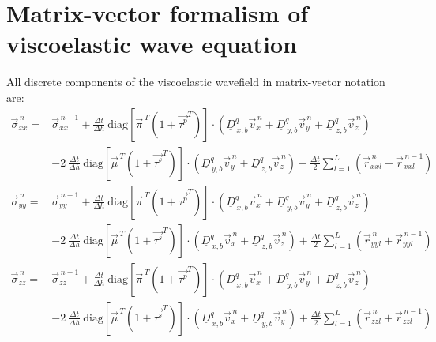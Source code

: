 \documentclass[pdftex,a4paper,parskip,listof=totoc,bibliography=totoc,onehalfspacing,12pt]{scrreprt}
\begin{document}
\section{Matrix-vector formalism of viscoelastic wave equation}
All discrete components of the viscoelastic wavefield in matrix-vector notation are: 
\begin{align*}
	\vec{\sigma}_{xx}^{\,n} =& \vec{\sigma}_{xx}^{\,n-1} + \frac{\Delta t}{\Delta h}~ \mathrm{diag} \left[ \vec{\pi}^{\,T} (1+\vec{\tau^p}^{T}) \right] \cdot \left( \underline{D}_{\,x,b}^q \vec{v}_x^{\,n} +\underline{D}_{\,y,b}^q \vec{v}_y^{\,n} + \underline{D}_{\,z,b}^q \vec{v}_z^{\,n} \right) \\
	&- 2~ \frac{\Delta t}{\Delta h} ~\mathrm{diag} \left[ \vec{\mu}^{\,T} (1+\vec{\tau^s}^{T}) \right] \cdot \left( \underline{D}_{\,y,b}^q \vec{v}_y^{\,n} + \underline{D}_{\,z,b}^q \vec{v}_z^{\,n} \right) + \frac{\Delta t}{2} \sum_{l=1}^L \left( \vec{r}_{xxl}^{\,n} + \vec{r}_{xxl}^{\,n-1} \right)\\
	\vec{\sigma}_{yy}^{\,n} =& \vec{\sigma}_{yy}^{\,n-1} + \frac{\Delta t}{\Delta h}~ \mathrm{diag} \left[ \vec{\pi}^{\,T} (1+\vec{\tau^p}^{T}) \right] \cdot \left( \underline{D}_{\,x,b}^q \vec{v}_x^{\,n} +\underline{D}_{\,y,b}^q \vec{v}_y^{\,n} + \underline{D}_{\,z,b}^q \vec{v}_z^{\,n} \right) \\
	&- 2~ \frac{\Delta t}{\Delta h} ~\mathrm{diag} \left[ \vec{\mu}^{\,T} (1+\vec{\tau^s}^{T}) \right] \cdot \left( \underline{D}_{\,x,b}^q \vec{v}_x^{\,n} + \underline{D}_{\,z,b}^q \vec{v}_z^{\,n} \right) + \frac{\Delta t}{2} \sum_{l=1}^L \left( \vec{r}_{yyl}^{\,n} + \vec{r}_{yyl}^{\,n-1} \right)\\
	\vec{\sigma}_{zz}^{\,n} =& \vec{\sigma}_{zz}^{\,n-1} + \frac{\Delta t}{\Delta h}~ \mathrm{diag} \left[ \vec{\pi}^{\,T} (1+\vec{\tau^p}^{T}) \right] \cdot \left( \underline{D}_{\,x,b}^q \vec{v}_x^{\,n} +\underline{D}_{\,y,b}^q \vec{v}_y^{\,n} + \underline{D}_{\,z,b}^q \vec{v}_z^{\,n} \right) \\
	&- 2~ \frac{\Delta t}{\Delta h} ~\mathrm{diag} \left[ \vec{\mu}^{\,T} (1+\vec{\tau^s}^{T}) \right] \cdot \left( \underline{D}_{\,x,b}^q \vec{v}_x^{\,n} + \underline{D}_{\,y,b}^q \vec{v}_y^{\,n} \right) + \frac{\Delta t}{2} \sum_{l=1}^L \left( \vec{r}_{zzl}^{\,n} + \vec{r}_{zzl}^{\,n-1} \right)\\
\end{align*}
\end{document}
